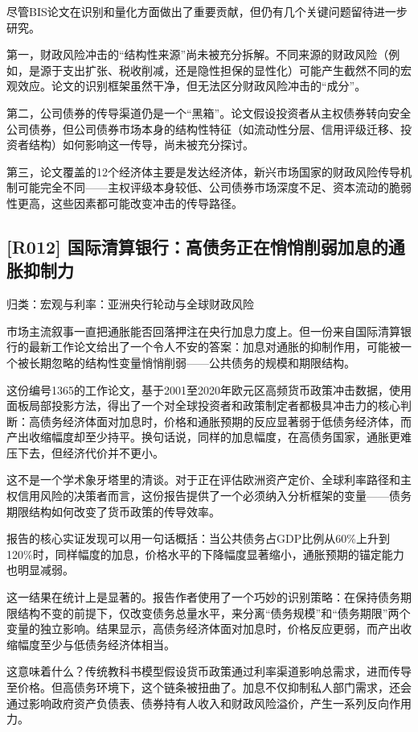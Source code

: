 \documentclass[11pt]{ctexart}
\begin{document}
尽管BIS论文在识别和量化方面做出了重要贡献，但仍有几个关键问题留待进一步研究。

第一，财政风险冲击的“结构性来源”尚未被充分拆解。不同来源的财政风险（例如，是源于支出扩张、税收削减，还是隐性担保的显性化）可能产生截然不同的宏观效应。论文的识别框架虽然干净，但无法区分财政风险冲击的“成分”。

第二，公司债券的传导渠道仍是一个“黑箱”。论文假设投资者从主权债券转向安全公司债券，但公司债券市场本身的结构性特征（如流动性分层、信用评级迁移、投资者结构）如何影响这一传导，尚未被充分探讨。

第三，论文覆盖的12个经济体主要是发达经济体，新兴市场国家的财政风险传导机制可能完全不同——主权评级本身较低、公司债券市场深度不足、资本流动的脆弱性更高，这些因素都可能改变冲击的传导路径。

\subsection{[R012] 国际清算银行：高债务正在悄悄削弱加息的通胀抑制力}
{\small\color{refgray}归类：宏观与利率：亚洲央行轮动与全球财政风险}

市场主流叙事一直把通胀能否回落押注在央行加息力度上。但一份来自国际清算银行的最新工作论文给出了一个令人不安的答案：加息对通胀的抑制作用，可能被一个被长期忽略的结构性变量悄悄削弱——公共债务的规模和期限结构。

这份编号1365的工作论文，基于2001至2020年欧元区高频货币政策冲击数据，使用面板局部投影方法，得出了一个对全球投资者和政策制定者都极具冲击力的核心判断：高债务经济体面对加息时，价格和通胀预期的反应显著弱于低债务经济体，而产出收缩幅度却至少持平。换句话说，同样的加息幅度，在高债务国家，通胀更难压下去，但经济代价并不更小。

这不是一个学术象牙塔里的清谈。对于正在评估欧洲资产定价、全球利率路径和主权信用风险的决策者而言，这份报告提供了一个必须纳入分析框架的变量——债务期限结构如何改变了货币政策的传导效率。

报告的核心实证发现可以用一句话概括：当公共债务占GDP比例从60\%上升到120\%时，同样幅度的加息，价格水平的下降幅度显著缩小，通胀预期的锚定能力也明显减弱。

这一结果在统计上是显著的。报告作者使用了一个巧妙的识别策略：在保持债务期限结构不变的前提下，仅改变债务总量水平，来分离“债务规模”和“债务期限”两个变量的独立影响。结果显示，高债务经济体面对加息时，价格反应更弱，而产出收缩幅度至少与低债务经济体相当。

这意味着什么？传统教科书模型假设货币政策通过利率渠道影响总需求，进而传导至价格。但高债务环境下，这个链条被扭曲了。加息不仅抑制私人部门需求，还会通过影响政府资产负债表、债券持有人收入和财政风险溢价，产生一系列反向作用力。
\end{document}
